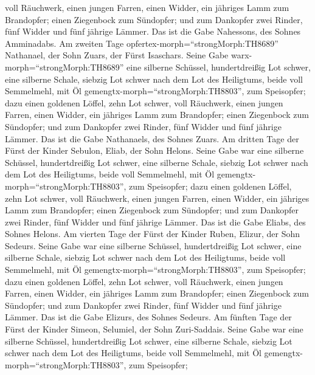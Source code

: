 voll Räuchwerk,  einen jungen Farren, einen Widder, ein
jähriges Lamm zum Brandopfer;  einen Ziegenbock zum
Sündopfer;  und zum Dankopfer zwei Rinder, fünf Widder und
fünf jährige Lämmer. Das ist die Gabe Nahessons, des Sohnes Amminadabs.
 Am zweiten Tage opfertex-morph=``strongMorph:TH8689''
Nathanael, der Sohn Zuars, der Fürst Isaschars.  Seine Gabe
warx-morph=``strongMorph:TH8689'' eine silberne Schüssel, hundertdreißig
Lot schwer, eine silberne Schale, siebzig Lot schwer nach dem Lot des
Heiligtums, beide voll Semmelmehl, mit Öl
gemengtx-morph=``strongMorph:TH8803'', zum Speisopfer; 
dazu einen goldenen Löffel, zehn Lot schwer, voll Räuchwerk,
 einen jungen Farren, einen Widder, ein jähriges Lamm zum
Brandopfer;  einen Ziegenbock zum Sündopfer; 
und zum Dankopfer zwei Rinder, fünf Widder und fünf jährige Lämmer. Das
ist die Gabe Nathanaels, des Sohnes Zuars.  Am dritten Tage
der Fürst der Kinder Sebulon, Eliab, der Sohn Helons. 
Seine Gabe war eine silberne Schüssel, hundertdreißig Lot schwer, eine
silberne Schale, siebzig Lot schwer nach dem Lot des Heiligtums, beide
voll Semmelmehl, mit Öl gemengtx-morph=``strongMorph:TH8803'', zum
Speisopfer;  dazu einen goldenen Löffel, zehn Lot schwer,
voll Räuchwerk,  einen jungen Farren, einen Widder, ein
jähriges Lamm zum Brandopfer;  einen Ziegenbock zum
Sündopfer;  und zum Dankopfer zwei Rinder, fünf Widder und
fünf jährige Lämmer. Das ist die Gabe Eliabs, des Sohnes Helons.
 Am vierten Tage der Fürst der Kinder Ruben, Elizur, der
Sohn Sedeurs.  Seine Gabe war eine silberne Schüssel,
hundertdreißig Lot schwer, eine silberne Schale, siebzig Lot schwer nach
dem Lot des Heiligtums, beide voll Semmelmehl, mit Öl
gemengtx-morph=``strongMorph:TH8803'', zum Speisopfer; 
dazu einen goldenen Löffel, zehn Lot schwer, voll Räuchwerk,
 einen jungen Farren, einen Widder, ein jähriges Lamm zum
Brandopfer;  einen Ziegenbock zum Sündopfer; 
und zum Dankopfer zwei Rinder, fünf Widder und fünf jährige Lämmer. Das
ist die Gabe Elizurs, des Sohnes Sedeurs.  Am fünften Tage
der Fürst der Kinder Simeon, Selumiel, der Sohn Zuri-Saddais.
 Seine Gabe war eine silberne Schüssel, hundertdreißig Lot
schwer, eine silberne Schale, siebzig Lot schwer nach dem Lot des
Heiligtums, beide voll Semmelmehl, mit Öl
gemengtx-morph=``strongMorph:TH8803'', zum Speisopfer; 

